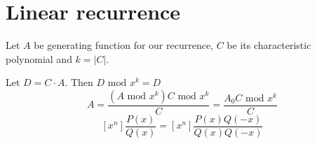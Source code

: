 \section{Linear recurrence}
Let $A$ be generating function for our recurrence, $C$ be its characteristic polynomial and $k = |C|$.

Let $D = C \cdot A$. Then $D \text{ mod } x^k = D$
$$A = \frac{(A \text{ mod } x^k) C \text{ mod } x^k}{C} = \frac{A_0C \text{ mod } x^k}{C}$$
$$[x^n]\frac{P(x)}{Q(x)} = [x^n]\frac{P(x)Q(-x)}{Q(x)Q(-x)}$$
